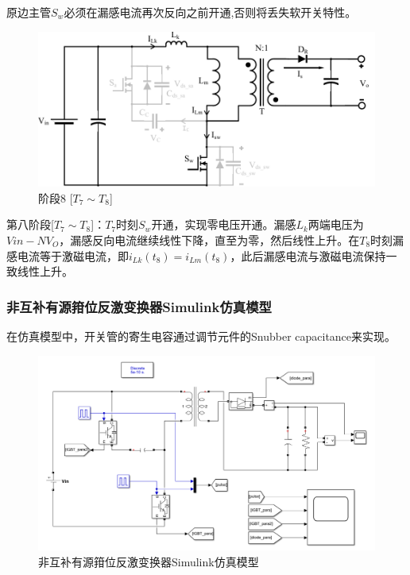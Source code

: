 \documentclass[UTF8]{ctexart}
\numberwithin{equation}{section}
\begin{document}
	原边主管$S_w$必须在漏感电流再次反向之前开通,否则将丢失软开关特性。
	
	\begin{figure}[h]
		\centering
		\includegraphics[scale=0.5]{image/mo8.pdf}
		\caption{阶段8 [$T_7 \sim T_8$]}
	\end{figure}
	
	第八阶段[$T_7 \sim T_8$]：$T_7$时刻$S_w$开通，实现零电压开通。漏感$L_k$两端电压为$V{in}-NV_O$，漏感反向电流继续线性下降，直至为零，然后线性上升。在$T_8$时刻漏感电流等于激磁电流，即$i_{Lk}(t_8) = i_{Lm}(t_8)$，此后漏感电流与激磁电流保持一致线性上升。
	
	\newpage
	\subsubsection{非互补有源箝位反激变换器Simulink仿真模型}
	在仿真模型中，开关管的寄生电容通过调节元件的Snubber capacitance来实现。
	
	\begin{figure}[htbp]
		\centering
		\includegraphics[scale=0.34]{image/new_flyback.png}
		\caption{非互补有源箝位反激变换器Simulink仿真模型}
	\end{figure}
	
\end{document}
